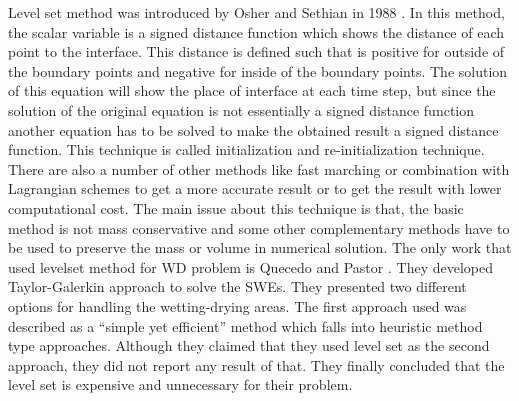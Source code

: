 \documentclass[letterpaper,10pt]{article}
\begin{document}

Level set method was introduced by Osher and Sethian in 1988 \cite{Osher1988}. In this method, the scalar variable is a signed distance function which shows the distance of each point to the interface. This distance is defined such that is positive for outside of the boundary points and negative for inside of the boundary points. The solution of this equation will show the place of interface at each time step, but since the solution of the original equation is not essentially a signed distance function another equation has to be solved to make the obtained result a signed distance function. This technique is called initialization and re-initialization technique. There are also a number of other methods like fast marching or combination with Lagrangian schemes to get a more accurate result or to get the result with lower computational cost. The main issue about this technique is that, the basic method is not mass conservative and some other complementary methods have to be used to preserve the mass or volume in numerical solution.
The only work that used levelset method for WD problem is Quecedo and Pastor \cite{quecedo2002rtg}. They developed Taylor-Galerkin approach to solve the SWEs. They presented two different options for handling the wetting-drying 
areas. The first approach used was described as a ``simple yet efficient'' method which falls into heuristic method type approaches. Although they claimed that they used level set as the second approach, they did not report any result of that.
They finally concluded that the level set is expensive and unnecessary for their problem.\newline

\end{document}
